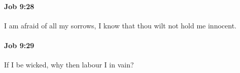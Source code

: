 		\paragraph{Job 9:28} %
			\label{JOB-9-28}

			I am afraid of all my sorrows, I know that thou wilt not hold me innocent.


		\paragraph{Job 9:29} %
			\label{JOB-9-29}

			If I be wicked, why then labour I in vain?


